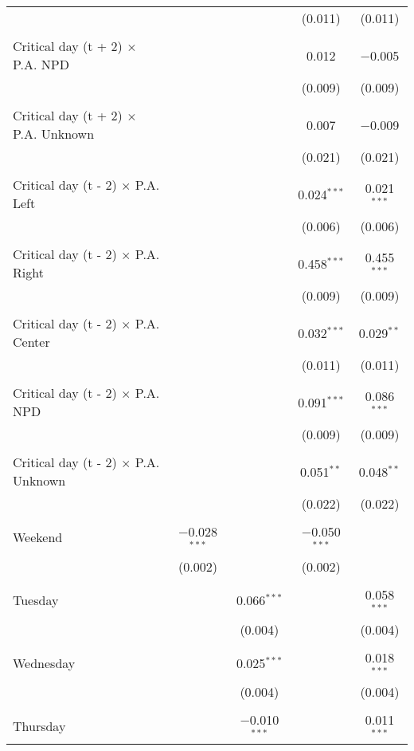 \documentclass[
]{article}
\begin{document}
\begin{table}[!htbp]
{\begin{tabular}{@{\extracolsep{5pt}}lcccc}
  &  &  & (0.011) & (0.011) \\ 
  & & & & \\ 
 Critical day (t + 2) $\times$ P.A. NPD &  &  & 0.012 & $-$0.005 \\ 
  &  &  & (0.009) & (0.009) \\ 
  & & & & \\ 
 Critical day (t + 2) $\times$ P.A. Unknown &  &  & 0.007 & $-$0.009 \\ 
  &  &  & (0.021) & (0.021) \\ 
  & & & & \\ 
 Critical day (t - 2) $\times$ P.A. Left &  &  & 0.024$^{***}$ & 0.021$^{***}$ \\ 
  &  &  & (0.006) & (0.006) \\ 
  & & & & \\ 
 Critical day (t - 2) $\times$ P.A. Right &  &  & 0.458$^{***}$ & 0.455$^{***}$ \\ 
  &  &  & (0.009) & (0.009) \\ 
  & & & & \\ 
 Critical day (t - 2) $\times$ P.A. Center &  &  & 0.032$^{***}$ & 0.029$^{**}$ \\ 
  &  &  & (0.011) & (0.011) \\ 
  & & & & \\ 
 Critical day (t - 2) $\times$ P.A. NPD &  &  & 0.091$^{***}$ & 0.086$^{***}$ \\ 
  &  &  & (0.009) & (0.009) \\ 
  & & & & \\ 
 Critical day (t - 2) $\times$ P.A. Unknown &  &  & 0.051$^{**}$ & 0.048$^{**}$ \\ 
  &  &  & (0.022) & (0.022) \\ 
  & & & & \\ 
 Weekend & $-$0.028$^{***}$ &  & $-$0.050$^{***}$ &  \\ 
  & (0.002) &  & (0.002) &  \\ 
  & & & & \\ 
 Tuesday &  & 0.066$^{***}$ &  & 0.058$^{***}$ \\ 
  &  & (0.004) &  & (0.004) \\ 
  & & & & \\ 
 Wednesday &  & 0.025$^{***}$ &  & 0.018$^{***}$ \\ 
  &  & (0.004) &  & (0.004) \\ 
  & & & & \\ 
 Thursday &  & $-$0.010$^{***}$ &  & 0.011$^{***}$ \\ 

\end{tabular}}
\end{table}
\end{document}
